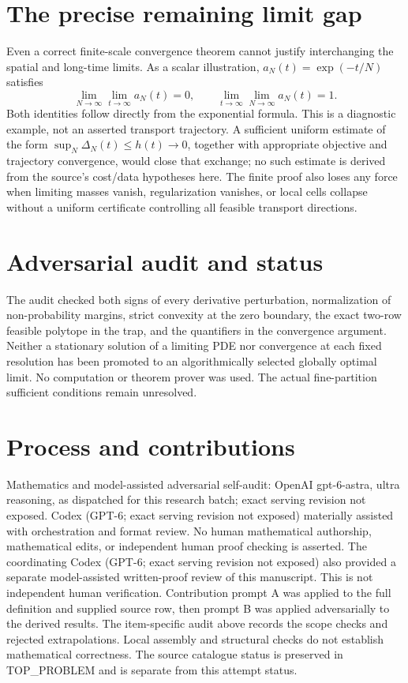 \documentclass[11pt]{article}
\begin{document}
\section{The precise remaining limit gap}
Even a correct finite-scale convergence theorem cannot justify
interchanging the spatial and long-time limits. As a scalar
illustration, $a_N(t)=\exp(-t/N)$ satisfies
\[
 \lim_{N\to\infty}\lim_{t\to\infty}a_N(t)=0,
 \qquad
 \lim_{t\to\infty}\lim_{N\to\infty}a_N(t)=1.
\]
Both identities follow directly from the exponential formula.
This is a diagnostic example, not an asserted transport trajectory.
A sufficient uniform estimate of the form
$\sup_N\Delta_N(t)\le h(t)\to0$, together with appropriate objective
and trajectory convergence, would close that exchange; no such
estimate is derived from the source's cost/data hypotheses here.
The finite proof also loses any force when limiting masses vanish,
regularization vanishes, or local cells collapse without a uniform
certificate controlling all feasible transport directions.

\section{Adversarial audit and status}
The audit checked both signs of every derivative perturbation,
normalization of non-probability margins, strict convexity at the
zero boundary, the exact two-row feasible polytope in the trap,
and the quantifiers in the convergence argument. Neither a
stationary solution of a limiting PDE nor convergence at each
fixed resolution has been promoted to an algorithmically selected
globally optimal limit. No computation or theorem prover was used.
The actual fine-partition sufficient conditions remain unresolved.

\section{Process and contributions}
Mathematics and model-assisted adversarial self-audit: OpenAI gpt-6-astra, ultra reasoning, as dispatched for this research batch; exact serving revision not exposed. Codex (GPT-6; exact serving revision not exposed) materially assisted with orchestration and format review. No human mathematical authorship, mathematical edits, or independent human proof checking is asserted.
The coordinating Codex (GPT-6; exact serving revision not exposed) also provided a separate model-assisted written-proof review of this manuscript. This is not independent human verification.
Contribution prompt A was applied to the full definition and supplied source row, then prompt B was applied adversarially to the derived results. The item-specific audit above records the scope checks and rejected extrapolations. Local assembly and structural checks do not establish mathematical correctness. The source catalogue status is preserved in TOP\_PROBLEM and is separate from this attempt status.
\end{document}
